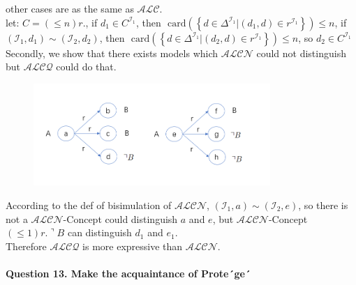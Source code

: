 \documentclass[12pt]{article}
\begin{document}
\begin{enumerate}
        other cases are as the same as $\mathcal{ALC}$. \\
        let: $C = (\leq n)r.$, if $d_1 \in C^{\mathcal{I}_1}$, then $\text{ card} \left(\left\{d \in \Delta ^{\mathcal{I}_1} | (d_1, d) \in r^{\mathcal{I}_1}\right\}\right) \leq n$, if 
        $(\mathcal{I}_1, d_1) \sim (\mathcal{I}_2, d_2)$, then  $\text{ card} \left(\left\{d \in \Delta ^{\mathcal{I}_1} | (d_2, d) \in r^{\mathcal{I}_1}\right\}\right) \leq n$, so $d_2 \in C^{\mathcal{I}_1}$ \\
        Secondly, we show that there exists models which $\mathcal{ALCN}$ could not distinguish but $\mathcal{ALCQ}$ could do that. \\
        \begin{figure}[h]
			\centering
			\includegraphics[width=0.8\textwidth]{12_2.png}\\
			\label{fig:roc}
			\end{figure}
        According to the def of bisimulation of $\mathcal{ALCN}$, $(\mathcal{I}_1, a) \sim (\mathcal{I}_2, e)$, so there is not a 
        $\mathcal{ALCN}$-Concept could distinguish $a$ and $e$, but $\mathcal{ALCN}$-Concept $(\leq 1)r. \urcorner B$ can distinguish $d_1$ and $e_1$. \\
        Therefore $\mathcal{ALCQ}$ is more expressive than $\mathcal{ALCN}$.
    \end{enumerate}

    \paragraph{Question 13. Make the acquaintance of Prote´ge´}~{}
    \\
\end{document}
